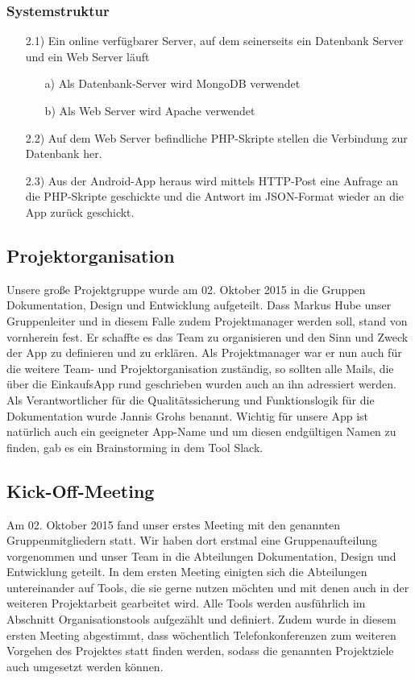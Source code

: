 \documentclass[12pt,a4paper]{article}
\begin{document}
\subsubsection{Systemstruktur}
\begin{itemize}
 \item[2.1)] Ein online verfügbarer Server, auf dem seinerseits ein Datenbank Server und ein Web Server läuft
 \begin{itemize}
\item[a)]Als Datenbank-Server wird MongoDB verwendet
\item[b)]Als Web Server wird Apache verwendet
\end{itemize}
\item[2.2)] Auf dem Web Server befindliche PHP-Skripte stellen die Verbindung zur Datenbank her.
\item[2.3)] Aus der Android-App heraus wird mittels HTTP-Post eine Anfrage an die PHP-Skripte geschickte und die Antwort im JSON-Format wieder an die App zurück geschickt.
\end{itemize}

\newpage

\subsection{Projektorganisation}
Unsere große Projektgruppe wurde am 02. Oktober 2015 in die Gruppen Dokumentation, Design und Entwicklung aufgeteilt.
Dass Markus Hube unser Gruppenleiter und in diesem Falle zudem Projektmanager werden soll, stand von vornherein fest.
Er schaffte es das Team zu organisieren und den Sinn und Zweck der App zu definieren und zu erklären. Als Projektmanager war er nun auch für die weitere Team- und Projektorganisation zuständig, so sollten alle Mails, die über die EinkaufsApp rund geschrieben wurden auch an ihn adressiert werden.
Als Verantwortlicher für die Qualitätssicherung und Funktionslogik für die Dokumentation wurde Jannis Grohs benannt.
Wichtig für unsere App ist natürlich auch ein geeigneter App-Name und um diesen endgültigen Namen zu finden, gab es ein Brainstorming in dem Tool Slack.

\subsection{Kick-Off-Meeting}
Am 02. Oktober  2015 fand unser erstes Meeting mit den genannten Gruppenmitgliedern statt. 
Wir haben dort erstmal eine Gruppenaufteilung vorgenommen und unser Team in die Abteilungen Dokumentation, Design und Entwicklung geteilt. 
In dem ersten Meeting einigten sich die Abteilungen untereinander auf Tools, die sie gerne nutzen möchten und mit denen auch in der weiteren Projektarbeit gearbeitet wird. Alle Tools werden ausführlich im Abschnitt Organisationstools aufgezählt und definiert.
Zudem wurde in diesem ersten Meeting abgestimmt, dass wöchentlich Telefonkonferenzen zum weiteren Vorgehen des Projektes statt finden werden, sodass die genannten Projektziele auch umgesetzt werden können. 
\end{document}
